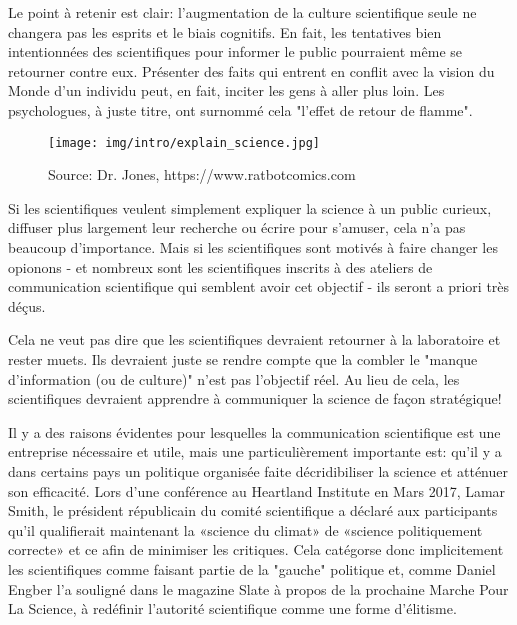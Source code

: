 	Le point à retenir est clair: l'augmentation de la culture scientifique seule ne changera pas les esprits et le biais cognitifs. En fait, les tentatives bien intentionn\'ees des scientifiques pour informer le public pourraient même se retourner contre eux. Pr\'esenter des faits qui entrent en conflit avec la vision du Monde d'un individu peut, en fait, inciter les gens à aller plus loin. Les psychologues, à juste titre, ont surnomm\'e cela "l'effet de retour de flamme".
	\begin{figure}[H]
		\centering
		\texttt{[image: img/intro/explain\_science.jpg]}
		\caption[]{Source: Dr. Jones, https://www.ratbotcomics.com}
	\end{figure}
	Si les scientifiques veulent simplement expliquer la science à un public curieux, diffuser plus largement leur recherche ou \'ecrire pour s'amuser, cela n'a pas beaucoup d'importance. Mais si les scientifiques sont motiv\'es à faire changer les opionons - et nombreux sont les scientifiques inscrits à des ateliers de communication scientifique qui semblent avoir cet objectif - ils seront a priori très d\'eçus.

	Cela ne veut pas dire que les scientifiques devraient retourner à la laboratoire et rester muets. Ils devraient juste se rendre compte que la combler le "manque d'information (ou de culture)" n'est pas l'objectif r\'eel. Au lieu de cela, les scientifiques devraient apprendre à communiquer la science de façon strat\'egique!

	Il y a des raisons \'evidentes pour lesquelles la communication scientifique est une entreprise n\'ecessaire et utile, mais une particulièrement importante est: qu'il y a dans certains pays un politique organis\'ee faite d\'ecridibiliser la science et att\'enuer son efficacit\'e. Lors d'une conf\'erence au Heartland Institute en Mars 2017, Lamar Smith, le pr\'esident r\'epublicain du comit\'e scientifique a d\'eclar\'e aux participants qu'il qualifierait maintenant la «science du climat» de «science politiquement correcte» et ce afin de minimiser les critiques. Cela cat\'egorse donc implicitement les scientifiques comme faisant partie de la "gauche" politique et, comme Daniel Engber l'a soulign\'e dans le magazine Slate à propos de la prochaine Marche Pour La Science, à red\'efinir l'autorit\'e scientifique comme une forme d'\'elitisme.


